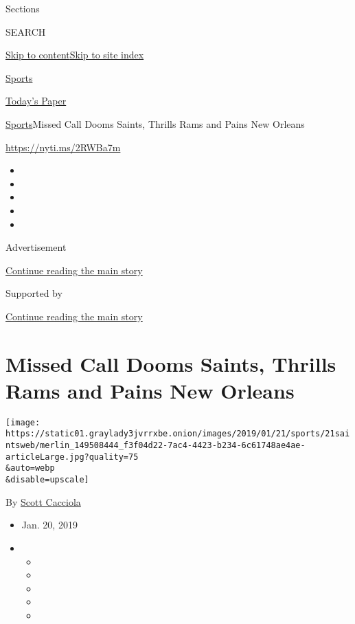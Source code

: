 Sections

SEARCH

\protect\hyperlink{site-content}{Skip to
content}\protect\hyperlink{site-index}{Skip to site index}

\href{https://www.nytimes3xbfgragh.onion/section/sports}{Sports}

\href{https://myaccount.nytimes3xbfgragh.onion/auth/login?response_type=cookie\&client_id=vi}{}

\href{https://www.nytimes3xbfgragh.onion/section/todayspaper}{Today's
Paper}

\href{/section/sports}{Sports}\textbar{}Missed Call Dooms Saints,
Thrills Rams and Pains New Orleans

\url{https://nyti.ms/2RWBa7m}

\begin{itemize}
\item
\item
\item
\item
\item
\end{itemize}

Advertisement

\protect\hyperlink{after-top}{Continue reading the main story}

Supported by

\protect\hyperlink{after-sponsor}{Continue reading the main story}

\hypertarget{missed-call-dooms-saints-thrills-rams-and-pains-new-orleans}{%
\section{Missed Call Dooms Saints, Thrills Rams and Pains New
Orleans}\label{missed-call-dooms-saints-thrills-rams-and-pains-new-orleans}}

\texttt{[image: https://static01.graylady3jvrrxbe.onion/images/2019/01/21/sports/21saintsweb/merlin\_149508444\_f3f04d22-7ac4-4423-b234-6c61748ae4ae-articleLarge.jpg?quality=75\\\&auto=webp\\\&disable=upscale]}

By \href{https://www.nytimes3xbfgragh.onion/by/scott-cacciola}{Scott
Cacciola}

\begin{itemize}
\item
  Jan. 20, 2019
\item
  \begin{itemize}
  \item
  \item
  \item
  \item
  \item
  \end{itemize}
\end{itemize}

